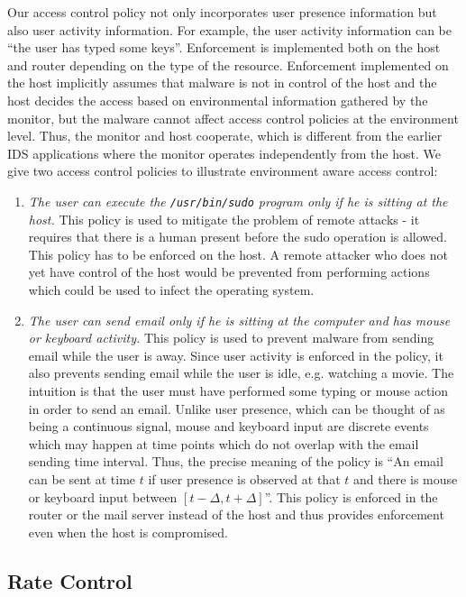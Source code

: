 Our access control policy not only incorporates user presence information
but also user activity information.
For example, the user activity information can be 
``the user has typed some keys''.
Enforcement is implemented both on the host and
router depending on the type of the resource. Enforcement implemented on
the host implicitly assumes that malware is not in control of the
host and the host decides the access based on environmental
information gathered by the monitor, but the malware cannot affect
access control policies at the environment level.
Thus, the monitor and host cooperate, which is different from the 
earlier IDS applications where the monitor operates independently from the host.
We give two access control policies to illustrate environment aware
access control:

\begin{enumerate}
\item {\em The user can execute the {\tt /usr/bin/sudo} program only if he
is sitting at the host.}
This policy is used to mitigate the problem of remote attacks - it requires
that there is a human present before the sudo operation is allowed.
This policy has to be enforced on the host.
A remote attacker who does not yet have control of the host would
be prevented from performing actions which could be used to infect the
operating system.

\item {\em The user can send email only if he is sitting at the computer
and has mouse or keyboard activity.}
This policy is used to prevent malware from sending email while the user
is away.
Since user activity is enforced in the policy, it also prevents sending
email while the user is idle, e.g. watching a movie.
The intuition is that the user must have performed some typing or
mouse action in order to send an email.
Unlike user presence, which can be thought of as being
a continuous signal, mouse and keyboard input are discrete events which may
happen at time points which do not overlap with the email sending time interval.
Thus, the precise meaning of the policy is
``An email can be sent at time $t$ if user presence is observed at that $t$
and there is mouse or keyboard input between $[t-\Delta, t+\Delta]$''.
This policy is enforced in the router or the mail server instead of
the host and thus provides enforcement even when the host is compromised.
\end{enumerate}

\subsection{Rate Control}
\label{sec:app-rate}

